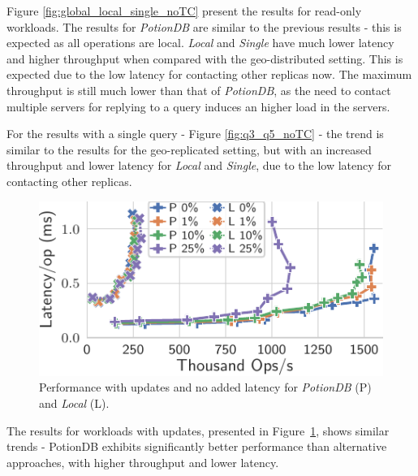 \documentclass[sigplan,twocolumn,review,anonymous]{acmart}
\begin{document}
Figure \ref{fig:global_local_single_noTC} present the results for read-only workloads.
The results for \textit{PotionDB} are similar to the previous results - this is expected as all operations are local.
\textit{Local} and \emph{Single} have much lower latency and higher throughput when compared with the
geo-distributed setting. This is expected due to the low latency for contacting other replicas now.
The maximum throughput is still much lower than that
of \textit{PotionDB}, as the need to contact multiple servers for replying to a query induces 
an higher load in the servers. 

For the results with a single query - Figure \ref{fig:q3_q5_noTC} - the trend is similar to 
the results for the geo-replicated setting, but with an increased throughput and lower latency
for \textit{Local} and \textit{Single}, due to the low latency for contacting other replicas. 


\begin{figure}
	\centering
	\includegraphics[width=0.62\linewidth]{singleQuery/upd_rate_noTC_global_vs_local}
	\vspace{-10pt}
	\caption{Performance with updates and no added latency for \textit{PotionDB} (P) and \textit{Local} (L).}
	\label{fig:update_rates_global_vs_local_noTC}
	\vspace{-12pt}
\end{figure}

The results for workloads with updates, presented in Figure~\ref{fig:update_rates_global_vs_local_noTC}, 
shows similar trends - PotionDB exhibits significantly better performance than alternative
approaches, with higher throughput and lower latency.  
\end{document}
